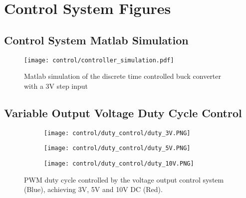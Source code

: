 \chapter{Control System Figures}\label{A:control}
\vspace{-20pt}

\section*{Control System Matlab Simulation}

\begin{figure}[H]
    \begin{center}
        \texttt{[image: control/controller\_simulation.pdf]}
        \caption{Matlab simulation of the discrete time controlled buck converter with a 3V step input}
    \end{center}
\end{figure}


\section*{Variable Output Voltage Duty Cycle Control} \label{A:control_duty}

\begin{figure}[H]
    
    \centering
    \begin{subfigure}{0.5\textwidth}
        \texttt{[image: control/duty\_control/duty\_3V.PNG]}
    \end{subfigure}
    \begin{subfigure}{0.5\textwidth}
        \texttt{[image: control/duty\_control/duty\_5V.PNG]}
    \end{subfigure}
    \begin{subfigure}{0.5\textwidth}
        \texttt{[image: control/duty\_control/duty\_10V.PNG]}
    \end{subfigure}
    \caption{PWM duty cycle controlled by the voltage output control system (Blue), achieving 3V, 5V and 10V DC (Red).}
\end{figure}

